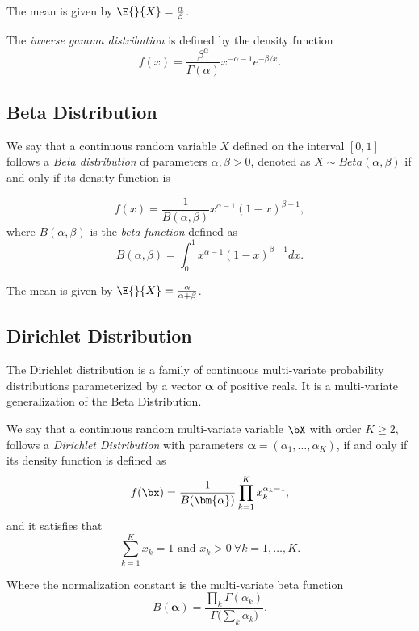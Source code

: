 The mean is given by \(\E{}{X} = \frac{\alpha}{\beta}\).

\begin{definition}
The \emph{inverse gamma distribution} is defined by the density function
\[
  f(x) =  \frac{\beta^{\alpha}}{\Gamma(\alpha)} x^{-\alpha-1}e^{-\beta/x}.
\]
\end{definition}


\subsection*{Beta Distribution}

\begin{definition}
We say that a continuous random variable \(X\) defined on the
interval \([0,1]\) follows a \emph{Beta distribution} of parameters \(\alpha,
\beta > 0\), denoted as \(X \sim Beta(\alpha, \beta)\) if and only if its
density function is

\[
  f(x) = \frac{1}{B(\alpha, \beta)}x^{\alpha - 1}(1-x)^{\beta -1},
\]
where \(B(\alpha, \beta)\) is the \emph{beta function} defined as
\[
  B(\alpha, \beta) = \int_0^1 x^{\alpha - 1}(1-x)^{\beta -1} dx.
\]
\end{definition}

The mean is given by \(\E{}{X} = \frac{\alpha}{\alpha + \beta}\).

\subsection*{Dirichlet Distribution}

The Dirichlet distribution is a family of continuous multi-variate probability
distributions parameterized by a vector \(\bm{\alpha}\) of positive reals. It is
a multi-variate generalization of the Beta Distribution.

\begin{definition}
  We say that a continuous random multi-variate variable \(\bX\) with order
  \(K \geq 2\), follows a \emph{Dirichlet
    Distribution} with parameters \(\bm{\alpha} = (\alpha_{1}, \dots, \alpha_{K})\), if and
  only if its density function is defined as
  \[
    f(\bx) = \frac{1}{B(\bm{\alpha})}\prod_{k = 1}^{K}x_{k}^{\alpha_{k}-1},
  \]
  and it satisfies that
  \[
    \sum_{k=1}^{K} x_{k} = 1 \text{ and } x_{k} > 0 \ \forall k=1,\dots,K.
  \]
\end{definition}

Where the normalization constant is the multi-variate beta function
\[
  B(\bm{\alpha}) = \frac{\prod_{k} \Gamma (\alpha_{k})}{\Gamma \big( \sum_{k}\alpha_{k} \big)}.
\]

